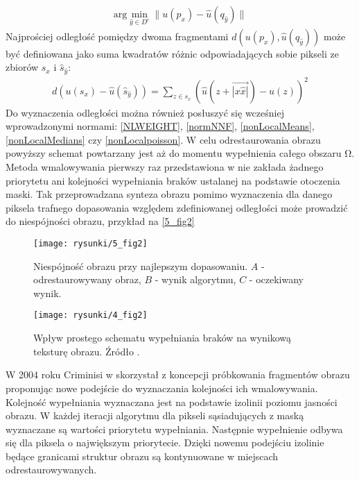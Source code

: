 \documentclass[12pt, twoside, openany]{report}
\theoremstyle{definition}
\begin{document}
\begin{align}
\mathrm{arg} \mathop{\mathrm{min}}_{\hat{y} \in D^c} \big\| u(p_x) - \hat{u} (q_{\hat{y}} ) \big\| 
\label{FROBDIST}
\end{align}
Najprościej odległość pomiędzy dwoma fragmentami $d\left( u(p_x), \hat{u} (q_{\hat{y}}) \right)$ może być definiowana jako suma kwadratów różnic odpowiadających sobie pikseli ze zbiorów $s_x$ i ${\hat{s}}_{\hat{y}}$:
\begin{align}
d\left( u(s_x) - \hat{u}( \hat{s}_{\hat{y}} )\right)= \sum_{z \in s_x} \left( \hat{u}(z + \overrightarrow{|x \hat{x}|}) - u(z) \right)^2
\label{FROBENIUS2} 
\end{align}
Do wyznaczenia odległości można również posłuszyć się wcześniej wprowadzonymi normami: \eqref{NLWEIGHT}, \eqref{normNNF}, \eqref{nonLocalMeans}, \eqref{nonLocalMedians} czy \eqref{nonLocalpoisson}. W celu odrestaurowania obrazu powyższy schemat powtarzany jest aż do momentu wypełnienia całego obszaru $\mathrm{\Omega }$.
Metoda wmalowywania pierwszy raz przedstawiona w  \cite{efros1999texture} nie zakłada żadnego priorytetu ani kolejności wypełniania braków ustalanej na podstawie otoczenia maski. Tak przeprowadzana synteza obrazu pomimo wyznaczenia dla danego piksela trafnego dopasowania względem zdefiniowanej odległości może prowadzić do niespójności obrazu, przykład na \autoref{5_fig2}
\begin{figure}[!h]
	\centering
	\texttt{[image: rysunki/5\_fig2]}
	\caption{Niespójność obrazu przy najlepszym dopasowaniu. $A$ - odrestaurowywany obraz, $B$ - wynik algorytmu, $C$ - oczekiwany wynik.}
	\label{5_fig2} 
\end{figure}
\par
\begin{figure}[!h]
	\centering
	\texttt{[image: rysunki/4\_fig2]}
	\caption{Wpływ prostego schematu wypełniania braków na wynikową teksturę obrazu. Źródło \cite{criminisi2004region}.}
	\label{4_fig2} 
\end{figure}
W 2004 roku Criminisi w \cite{criminisi2004region} skorzystał z koncepcji próbkowania fragmentów obrazu proponując nowe podejście do wyznaczania kolejności ich wmalowywania.  Kolejność wypełniania wyznaczana jest na podstawie izolinii poziomu jasności obrazu. W każdej iteracji algorytmu dla pikseli sąsiadujących z maską wyznaczane są wartości priorytetu wypełniania. Następnie wypełnienie odbywa się dla piksela o największym priorytecie. Dzięki nowemu podejściu izolinie będące granicami struktur obrazu są kontynuowane w miejscach odrestaurowywanych.
\end{document}
